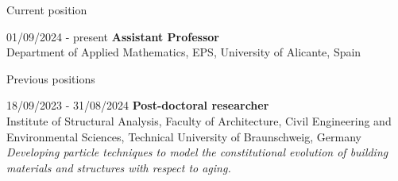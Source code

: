 \documentclass[letterpaper,english]{article}
\begin{document}
\begin{cv}{}
\begin{cvlist}{Current position}
     \item[\footnotesize{01/09/2024} - present] \textbf{Assistant Professor}\\
     Department of Applied Mathematics, EPS, University of Alicante, Spain
\end{cvlist}
\begin{cvlist}{Previous positions}

    \item[\footnotesize{18/09/2023} - 31/08/2024] \textbf{Post-doctoral researcher}\\
    Institute of Structural Analysis, Faculty of Architecture, Civil Engineering and Environmental Sciences, Technical University of Braunschweig, Germany \\
   \textit{Developing particle techniques to model the constitutional evolution of building materials and structures with respect to aging.}
   

\end{cvlist}
\end{cv}
\end{document}
